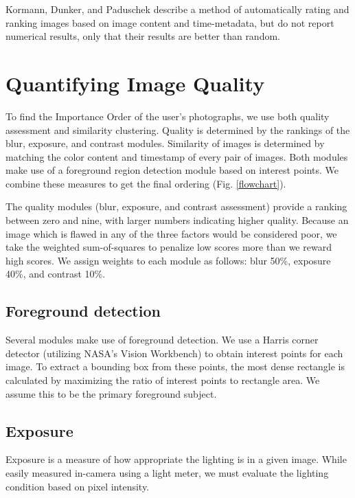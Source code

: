 \documentclass{sig-alternate}
\begin{document}
Kormann, Dunker, and Paduschek\cite{springerlink:10.1007/978-3-642-10543-2_23} describe a method of automatically rating and ranking images based on image content and time-metadata, but do not report numerical results, only that their results are better than random. 


\section{Quantifying Image Quality}

To find the Importance Order of the user's photographs, we use both quality assessment and similarity clustering. Quality is determined by the rankings of the blur, exposure, and contrast modules. Similarity of images is determined by matching the color content and timestamp of every pair of images. Both modules make use of a foreground region detection module based on interest points. We combine these measures to get the final ordering (Fig. \ref{flowchart}).

The quality modules (blur, exposure, and contrast assessment) provide a ranking between zero and nine, with larger numbers indicating higher quality. Because an image which is flawed in any of the three factors would be considered poor, we take the weighted sum-of-squares to penalize low scores more than we reward high scores. We assign weights to each module as follows: blur 50\%, exposure 40\%, and contrast 10\%.

\subsection{Foreground detection}\label{ContentRecognition}
Several modules make use of foreground detection. We use a Harris corner detector\cite{Harris} (utilizing NASA's Vision Workbench\cite{vision-workbench}) to obtain interest points for each image. To extract a bounding box from these points, the most dense rectangle is calculated by maximizing the ratio of interest points to rectangle area. We assume this to be the primary foreground subject.

\subsection{Exposure}

Exposure is a measure of how appropriate the lighting is in a given image. While easily measured in-camera using a light meter, we must evaluate the lighting condition based on pixel intensity.
\end{document}
